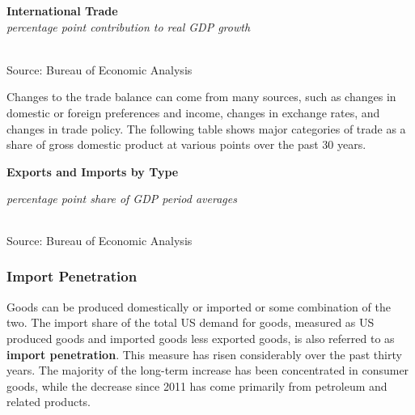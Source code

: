 \documentclass{report}
\makeatletter
\newcommand{\tbllink}[1]{\href{https://raw.githubusercontent.com/bdecon/US-chartbook/master/chartbook/data/#1}{\faTable}}
\newcommand*\short[1]{\expandafter\@gobbletwo\number\numexpr#1\relax}
\newcommand{\sbar}[4]{
		\addplot[ybar stacked, bar width=2.45pt, draw opacity=0, fill=#1] 
			table [x=#2, y=#3, col sep=comma]{#4};}
\newcommand{\dateaxisticks}{
		date coordinates in=x, axis line style={draw=none},
		xmax={2022-03-15},
		max space between ticks=40,	    
		xtick={{1990-01-01}, {1992-01-01}, {1994-01-01}, 
			{1996-01-01}, {1998-01-01}, {2000-01-01}, 
			{2002-01-01}, {2004-01-01}, {2006-01-01},
			{2008-01-01}, {2010-01-01}, {2012-01-01}, {2014-01-01},
		    {2016-01-01}, {2018-01-01}, {2020-01-01}, {2022-01-01}, 
		    {2024-01-01}, {2026-01-01}},
		minor xtick={{1989-01-01}, {1991-01-01}, {1993-01-01},
			{1995-01-01}, {1997-01-01}, {1999-01-01}, 
			{2001-01-01}, {2003-01-01}, {2005-01-01}, {2007-01-01},
		    {2009-01-01}, {2011-01-01}, {2013-01-01}, {2015-01-01},
		    {2017-01-01}, {2019-01-01}, {2021-01-01}, {2023-01-01}, 
		    {2025-01-01}, {2027-01-01}},
		enlarge y limits={0.06}, enlarge x limits={0.01},
		}
\newcommand{\bbar}[2]{extra #1 ticks = {{#2}}, extra #1 tick labels = ,
		extra #1 tick style = {grid=major, grid style={thick, black!25}},}
\newcommand{\rbars}{
		\fill[color=black!10] (axis cs:{1990-07-01},\pgfkeysvalueof{/pgfplots/ymin}) rectangle 
			(axis cs:{1991-03-01}, \pgfkeysvalueof{/pgfplots/ymax});
		\fill[color=black!10] (axis cs:{2007-12-01},\pgfkeysvalueof{/pgfplots/ymin}) rectangle 
			(axis cs:{2009-07-01}, \pgfkeysvalueof{/pgfplots/ymax});
		\fill[color=black!10] (axis cs:{2001-03-01},\pgfkeysvalueof{/pgfplots/ymin}) rectangle 
			(axis cs:{2001-11-01}, \pgfkeysvalueof{/pgfplots/ymax});
		\fill[color=black!10] (axis cs:{2020-02-01},\pgfkeysvalueof{/pgfplots/ymin}) rectangle 
			(axis cs:{2020-05-01}, \pgfkeysvalueof{/pgfplots/ymax});}
\makeatother
\begin{document}
{\begin{minipage}{0.76\textwidth}
\normalsize \textbf{International Trade}\\
\footnotesize{\textit{percentage point contribution to real GDP growth}}\\
\hspace*{-2mm} \\
\footnotesize{Source: Bureau of Economic Analysis} \hfill \tbllink{nx.csv}
\end{minipage}
\newpage
\begin{minipage}{0.76\textwidth}
\small Changes to the trade balance can come from many sources, such as changes in domestic or foreign preferences and income, changes in exchange rates, and changes in trade policy. The following table shows major categories of trade as a share of gross domestic product at various points over the past 30 years. 
\vspace{1mm}

\normalsize \textbf{Exports and Imports by Type}\\
\footnotesize{\textit{percentage point share of GDP \hspace{40mm} period averages}\\ 
 \setlength{\tabcolsep}{3.1pt} \color{black!90}
	{\renewcommand{\arraystretch}{1.55}
		\begin{tabular}{p{42mm} R{7.1mm} R{7.1mm} R{7.1mm} R{7.1mm} R{7.1mm} 
		   R{7.1mm} R{7.1mm} R{7.1mm} }
			  \hline
		\end{tabular}}\vspace{-2mm}
		
\footnotesize{Source: Bureau of Economic Analysis}}
\end{minipage}
\newpage
\subsubsection*{Import Penetration}
\begin{minipage}{0.76\textwidth}
\small Goods can be produced domestically or imported or some combination of the two. The import share of the total US demand for goods, measured as US produced goods and imported goods less exported goods, is also referred to as \textbf{import penetration}. This measure has risen considerably over the past thirty years. The majority of the long-term increase has been concentrated in consumer goods, while the decrease since 2011 has come primarily from petroleum and related products. 


\end{minipage}}
\end{document}
